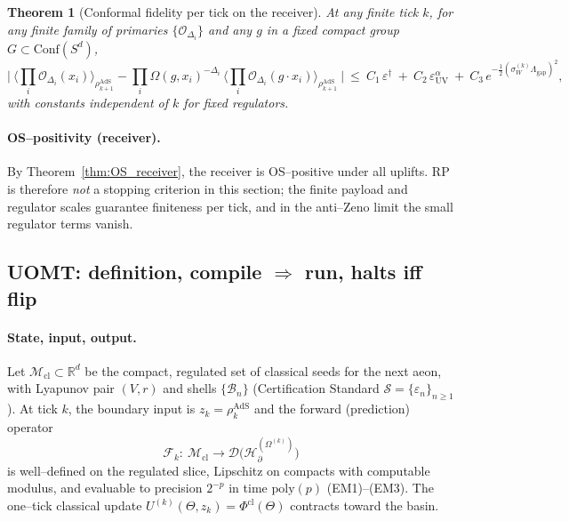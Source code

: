 \documentclass[10pt]{article}
\theoremstyle{definition}
\theoremstyle{plain}
\newtheorem{theorem}{Theorem}[section]
\begin{document}
\begin{theorem}[Conformal fidelity per tick on the receiver]
\label{thm:conformal-8}
At any finite tick $k$, for any finite family of primaries $\{\mathcal O_{\Delta_i}\}$ and any $g$ in a fixed compact group $G\subset \mathrm{Conf}(S^d)$,
\[
\Big|\ \langle \prod_i \mathcal O_{\Delta_i}(x_i)\rangle_{\rho_{k+1}^{\mathrm{AdS}}}
-\prod_i\Omega(g,x_i)^{-\Delta_i}\,\langle \prod_i \mathcal O_{\Delta_i}(g\!\cdot\!x_i)\rangle_{\rho_{k+1}^{\mathrm{AdS}}}\ \Big|
\ \le\ C_1\,\varepsilon^\dagger\ +\ C_2\,\varepsilon_{\mathrm{UV}}^\alpha\ +\ C_3\,e^{-\frac12(\sigma_W^{(k)}\Lambda_{\mathrm{gap}})^2},
\]
with constants independent of $k$ for fixed regulators.
\end{theorem}

\paragraph{OS--positivity (receiver).}\label{par:uom-main-201}
By Theorem~\ref{thm:OS_receiver}, the receiver is OS--positive under all uplifts.
RP is therefore \emph{not} a stopping criterion in this section; the finite payload and regulator scales guarantee finiteness per tick, and in the anti--Zeno limit the small regulator terms vanish.

\subsection{\texorpdfstring{UOMT: definition, compile $\Rightarrow$ run, halts iff flip}{UOMT: definition, compile => run, halts iff flip}}
\label{subsec:uomt-def}

\paragraph{State, input, output.}\label{par:uom-main-202}
Let $\mathcal M_{\mathrm{cl}}\subset \mathbb R^d$ be the compact, regulated set of classical seeds for the next aeon, with Lyapunov pair $(V,r)$ and shells $\{\mathcal B_n\}$ (Certification Standard $\mathcal S=\{\varepsilon_n\}_{n\ge 1}$).
At tick $k$, the boundary input is $z_k=\rho_k^{\mathrm{AdS}}$ and the forward (prediction) operator
\begin{equation}
\label{eq:forward-Fk}
\mathcal F_k:\ \mathcal M_{\mathrm{cl}}\longrightarrow \mathcal D\!\big(\mathcal H_\partial^{(\Omega^{(k)})}\big)
\end{equation}
is well--defined on the regulated slice, Lipschitz on compacts with computable modulus, and evaluable to precision $2^{-p}$ in time $\mathrm{poly}(p)$ (EM1)--(EM3).
The one--tick classical update $U^{(k)}(\Theta,z_k)=\Phi^{\mathrm{cl}}(\Theta)$ contracts toward the basin.
\end{document}
